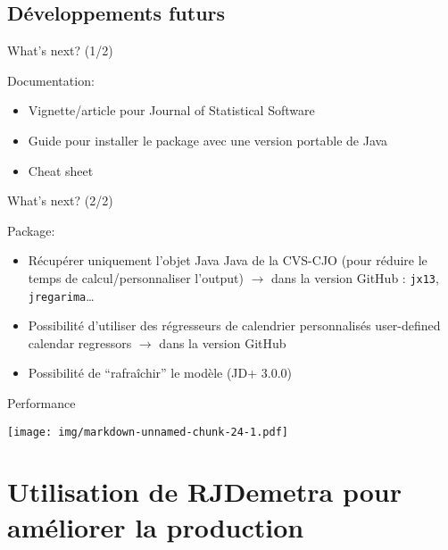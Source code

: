 \documentclass[10pt,xcolor=table,color={dvipsnames,usenames},ignorenonframetext,usepdftitle=false,french]{beamer}
\begin{document}
\hypertarget{developpements-futurs}{%
\subsection{Développements futurs}\label{developpements-futurs}}

\begin{frame}{What's next? \bcpanchant (1/2)}
\protect\hypertarget{whats-next-12}{}

Documentation:

\begin{itemize}
\item
  Vignette/article pour Journal of Statistical Software
\item
  Guide pour installer le package avec une version portable de Java
\item
  Cheat sheet
\end{itemize}

\end{frame}

\begin{frame}[fragile]{What's next? \bcpanchant (2/2)}
\protect\hypertarget{whats-next-22}{}

Package:

\begin{itemize}
\item
  Récupérer uniquement l'objet Java Java de la CVS-CJO (pour réduire le
  temps de calcul/personnaliser l'output) \(\rightarrow\) dans la
  version GitHub : \texttt{jx13}, \texttt{jregarima}\ldots{}
\item
  Possibilité d'utiliser des régresseurs de calendrier personnalisés
  user-defined calendar regressors \(\rightarrow\) dans la version
  GitHub
\item
  Possibilité de ``rafraîchir'' le modèle (JD+ 3.0.0)
\end{itemize}

\end{frame}

\begin{frame}{Performance}
\protect\hypertarget{performance}{}

\texttt{[image: img/markdown-unnamed-chunk-24-1.pdf]}

\end{frame}

\hypertarget{utilisation-de-rjdemetra-pour-ameliorer-la-production}{%
\section{Utilisation de RJDemetra pour améliorer la
production}\label{utilisation-de-rjdemetra-pour-ameliorer-la-production}}
\end{document}
